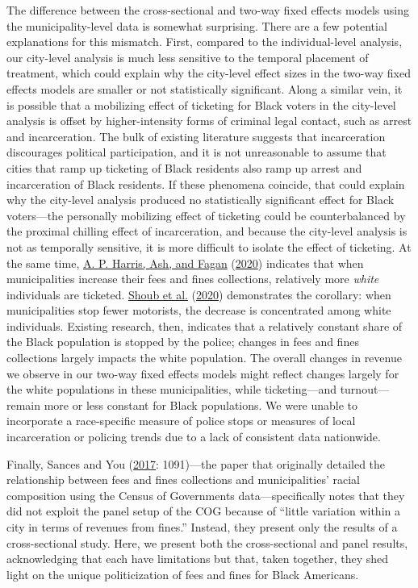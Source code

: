 \documentclass[
  12pt,
]{article}
\begin{document}
The difference between the cross-sectional and two-way fixed effects models using the municipality-level data is somewhat surprising. There are a few potential explanations for this mismatch. First, compared to the individual-level analysis, our city-level analysis is much less sensitive to the temporal placement of treatment, which could explain why the city-level effect sizes in the two-way fixed effects models are smaller or not statistically significant. Along a similar vein, it is possible that a mobilizing effect of ticketing for Black voters in the city-level analysis is offset by higher-intensity forms of criminal legal contact, such as arrest and incarceration. The bulk of existing literature suggests that incarceration discourages political participation, and it is not unreasonable to assume that cities that ramp up ticketing of Black residents also ramp up arrest and incarceration of Black residents. If these phenomena coincide, that could explain why the city-level analysis produced no statistically significant effect for Black voters---the personally mobilizing effect of ticketing could be counterbalanced by the proximal chilling effect of incarceration, and because the city-level analysis is not as temporally sensitive, it is more difficult to isolate the effect of ticketing. At the same time, \protect\hyperlink{ref-Harris2020}{A. P. Harris, Ash, and Fagan} (\protect\hyperlink{ref-Harris2020}{2020}) indicates that when municipalities increase their fees and fines collections, relatively more \emph{white} individuals are ticketed. \protect\hyperlink{ref-Shoub2020}{Shoub et al.} (\protect\hyperlink{ref-Shoub2020}{2020}) demonstrates the corollary: when municipalities stop fewer motorists, the decrease is concentrated among white individuals. Existing research, then, indicates that a relatively constant share of the Black population is stopped by the police; changes in fees and fines collections largely impacts the white population. The overall changes in revenue we observe in our two-way fixed effects models might reflect changes largely for the white populations in these municipalities, while ticketing---and turnout---remain more or less constant for Black populations. We were unable to incorporate a race-specific measure of police stops or measures of local incarceration or policing trends due to a lack of consistent data nationwide.

Finally, Sances and You (\protect\hyperlink{ref-Sances2017}{2017}: 1091)---the paper that originally detailed the relationship between fees and fines collections and municipalities' racial composition using the Census of Governments data---specifically notes that they did not exploit the panel setup of the COG because of ``little variation within a city in terms of revenues from fines.'' Instead, they present only the results of a cross-sectional study. Here, we present both the cross-sectional and panel results, acknowledging that each have limitations but that, taken together, they shed light on the unique politicization of fees and fines for Black Americans.
\end{document}
